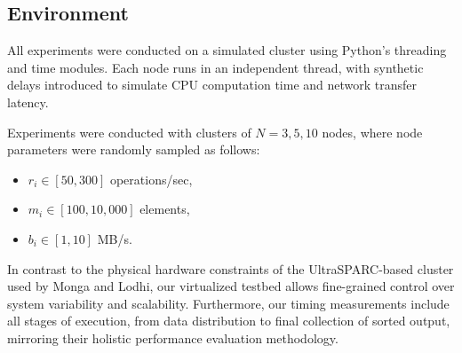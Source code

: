 \documentclass[]{interact}
\theoremstyle{plain}
\theoremstyle{definition}
\theoremstyle{remark}
\begin{document}
\subsection{Environment}
All experiments were conducted on a simulated cluster using Python’s threading and time modules. Each node runs in an independent thread, with synthetic delays introduced to simulate CPU computation time and network transfer latency.

Experiments were conducted with clusters of $N = 3, 5, 10$ nodes, where node parameters were randomly sampled as follows:
\begin{itemize}
\item $r_i \in [50, 300]$ operations/sec,
\item $m_i \in [100, 10{,}000]$ elements,
\item $b_i \in [1, 10]$ MB/s.
\end{itemize}

In contrast to the physical hardware constraints of the UltraSPARC-based cluster used by Monga and Lodhi, our virtualized testbed allows fine-grained control over system variability and scalability. Furthermore, our timing measurements include all stages of execution, from data distribution to final collection of sorted output, mirroring their holistic performance evaluation methodology.
\end{document}
